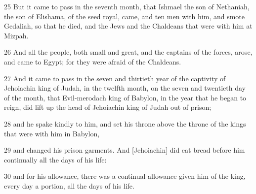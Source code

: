 \par 25 But it came to pass in the seventh month, that Ishmael the son of Nethaniah, the son of Elishama, of the seed royal, came, and ten men with him, and smote Gedaliah, so that he died, and the Jews and the Chaldeans that were with him at Mizpah.
\par 26 And all the people, both small and great, and the captains of the forces, arose, and came to Egypt; for they were afraid of the Chaldeans.
\par 27 And it came to pass in the seven and thirtieth year of the captivity of Jehoiachin king of Judah, in the twelfth month, on the seven and twentieth day of the month, that Evil-merodach king of Babylon, in the year that he began to reign, did lift up the head of Jehoiachin king of Judah out of prison;
\par 28 and he spake kindly to him, and set his throne above the throne of the kings that were with him in Babylon,
\par 29 and changed his prison garments. And [Jehoiachin] did eat bread before him continually all the days of his life:
\par 30 and for his allowance, there was a continual allowance given him of the king, every day a portion, all the days of his life.

